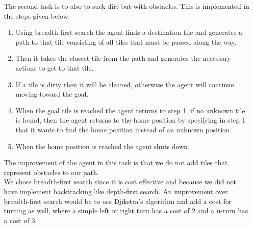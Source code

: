 \documentclass[a4paper,10pt]{article}
\begin{document}
The second task is to also to suck dirt but with obstacles. 
This is implemented in the steps given below.
\begin{enumerate}
	\item Using breadth-first search the agent finds a destination tile and generates a path to that tile consisting of all tiles that must be passed along the way.
	\item Then it takes the closest tile from the path and generates the necessary actions to get to that tile.
	\item If a tile is dirty then it will be cleaned, otherwise the agent will continue moving toward the goal.
	\item When the goal tile is reached the agent returns to step 1, if no unknown tile is found, then the agent returns to the home position by specifying in step 1 that it wants to find the home position instead of an unknown position.
	\item When the home position is reached the agent shuts down.
\end{enumerate}
The improvement of the agent in this task is that we do not add tiles that represent obstacles to our path.
\\
We chose breadth-first search since it is cost effective and because we did not have implement backtracking like depth-first search.
An improvement over breadth-first search would be to use Djikstra's algorithm and add a cost for turning as well, where a simple left or right turn has a cost
of 2 and a u-turn has a cost of 3.
\end{document}
